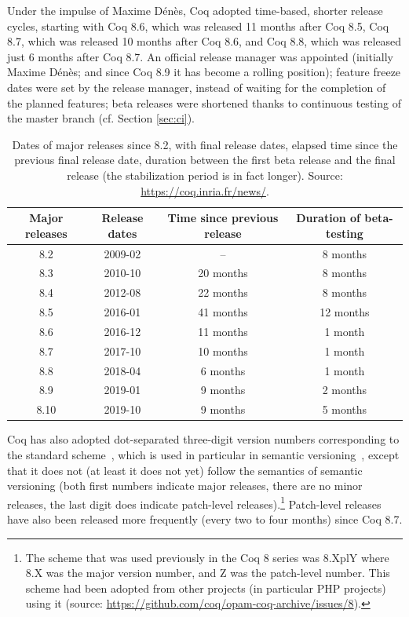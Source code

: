 Under the impulse of Maxime D\'en\`es, Coq adopted time-based, shorter release cycles, starting with Coq 8.6, which was released 11 months after Coq 8.5, Coq 8.7, which was released 10 months after Coq 8.6, and Coq 8.8, which was released just 6 months after Coq 8.7.
An official release manager was appointed (initially Maxime D\'en\`es; and since Coq 8.9 it has become a rolling position); feature freeze dates were set by the release manager, instead of waiting for the completion of the planned features; beta releases were shortened thanks to continuous testing of the master branch (cf. Section \ref{sec:ci}).

\begin{table}
	\begin{center}
		\begin{tabular}{|c|c|c|c|}
			\hline
			Major releases & Release dates & Time since previous release & Duration of beta-testing \\
			\hline
			8.2 & 2009-02 & -- & 8 months \\
			\hline
			8.3 & 2010-10 & 20 months & 8 months \\
			\hline
			8.4 & 2012-08 & 22 months & 8 months \\
			\hline
			8.5 & 2016-01 & 41 months & 12 months \\
			\hline
			8.6 & 2016-12 & 11 months & 1 month \\
			\hline
			8.7 & 2017-10 & 10 months & 1 month \\
			\hline
			8.8 & 2018-04 &  6 months & 1 month \\
			\hline
			8.9 & 2019-01 &  9 months & 2 months \\
			\hline
			8.10 & 2019-10 & 9 months & 5 months \\
			\hline
		\end{tabular}
		\caption{
			Dates of major releases since 8.2, with final release dates, elapsed time since the previous final release date, duration between the first beta release and the final release (the stabilization period is in fact longer).
			Source: \url{https://coq.inria.fr/news/}.
		}
		\label{tab:releases}
	\end{center}
\end{table}

Coq has also adopted dot-separated three-digit version numbers corresponding to the standard scheme~\cite[Chapter 7]{fogel2005producing}, which is used in particular in semantic versioning~\cite{preston_semantic_versioning}, except that it does not (at least it does not yet) follow the semantics of semantic versioning (both first numbers indicate major releases, there are no minor releases, the last digit does indicate patch-level releases).\footnote{
	The scheme that was used previously in the Coq 8 series was 8.XplY where 8.X was the major version number, and Z was the patch-level number.
	This scheme had been adopted from other projects (in particular PHP projects) using it (source: \url{https://github.com/coq/opam-coq-archive/issues/8}).
}
Patch-level releases have also been released more frequently (every two to four months) since Coq 8.7.

